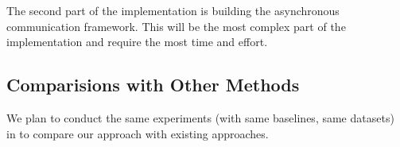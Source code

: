 \documentclass{article}
\begin{document}
The second part of the implementation is building the asynchronous communication
framework. This will be the most complex part of the implementation and require
the most time and effort.
\subsection{Comparisions with Other Methods}
We plan to conduct the same experiments (with same baselines, same datasets) in
\cite{yang2013trading} to compare our approach with existing approaches.

%


%
%
%
%
%


\end{document}

